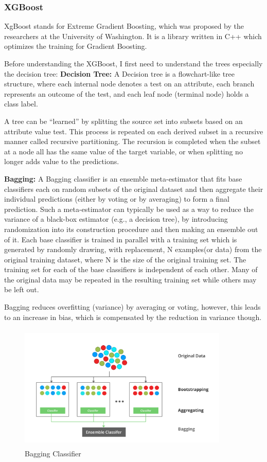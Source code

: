 \documentclass[12pt]{article}
\begin{document}
\subsubsection{XGBoost}
XgBoost stands for Extreme Gradient Boosting, which was proposed by the researchers at the University of Washington. It is a library written in C++ which optimizes the training for Gradient Boosting.

Before understanding the XGBoost, I first need to understand the trees especially the decision tree:
\textbf{Decision Tree:}
A Decision tree is a flowchart-like tree structure, where each internal node denotes a test on an attribute, each branch represents an outcome of the test, and each leaf node (terminal node) holds a class label. 

A tree can be “learned” by splitting the source set into subsets based on an attribute value test. This process is repeated on each derived subset in a recursive manner called recursive partitioning. The recursion is completed when the subset at a node all has the same value of the target variable, or when splitting no longer adds value to the predictions.

\textbf{Bagging:}
A Bagging classifier is an ensemble meta-estimator that fits base classifiers each on random subsets of the original dataset and then aggregate their individual predictions (either by voting or by averaging) to form a final prediction. Such a meta-estimator can typically be used as a way to reduce the variance of a black-box estimator (e.g., a decision tree), by introducing randomization into its construction procedure and then making an ensemble out of it.
Each base classifier is trained in parallel with a training set which is generated by randomly drawing, with replacement, N examples(or data) from the original training dataset, where N is the size of the original training set. The training set for each of the base classifiers is independent of each other. Many of the original data may be repeated in the resulting training set while others may be left out.

Bagging reduces overfitting (variance) by averaging or voting, however, this leads to an increase in bias, which is compensated by the reduction in variance though.

\begin{figure}[H]
\begin{center}
 \includegraphics[width=10cm, height=6cm]{Tech1}
\caption{Bagging Classifier}
\end{center}
\end{figure}
\end{document}
